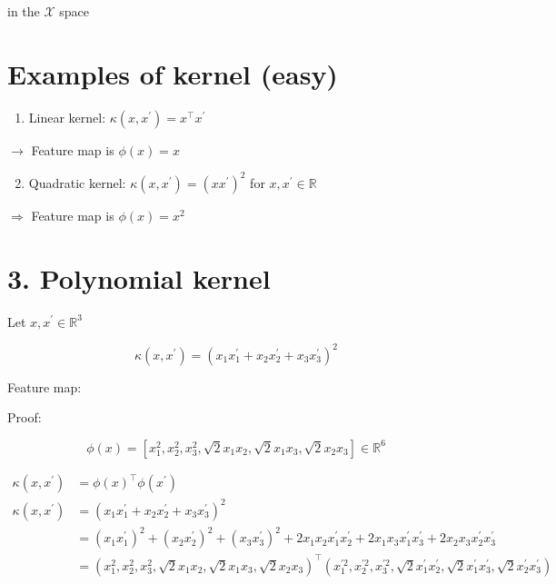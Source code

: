 \documentclass[10pt]{article}
\begin{document}
in the $\mathscr{X}$ space

\section*{Examples of kernel (easy)}
\begin{enumerate}
  \item Linear kernel: $\kappa\left(x, x^{\prime}\right)=x^{\top} x^{\prime}$
\end{enumerate}

$\rightarrow$ Feature map is $\phi(x)=x$

\begin{enumerate}
  \setcounter{enumi}{1}
  \item Quadratic kernel: $\kappa\left(x, x^{\prime}\right)=\left(x x^{\prime}\right)^{2}$ for $x, x^{\prime} \in \mathbb{R}$
\end{enumerate}

$\Rightarrow$ Feature map is $\phi(x)=x^{2}$

\section*{3. Polynomial kernel}
Let $x, x^{\prime} \in \mathbb{R}^{3}$

$$
\kappa\left(x, x^{\prime}\right)=\left(x_{1} x_{1}^{\prime}+x_{2} x_{2}^{\prime}+x_{3} x_{3}^{\prime}\right)^{2}
$$

Feature map:

Proof:

$$
\phi(x)=\left[x_{1}^{2}, x_{2}^{2}, x_{3}^{2}, \sqrt{2} x_{1} x_{2}, \sqrt{2} x_{1} x_{3}, \sqrt{2} x_{2} x_{3}\right] \in \mathbb{R}^{6}
$$

$$
\begin{aligned}
\kappa\left(x, x^{\prime}\right) & =\phi(x)^{\top} \phi\left(x^{\prime}\right) \\
\kappa\left(x, x^{\prime}\right) & =\left(x_{1} x_{1}^{\prime}+x_{2} x_{2}^{\prime}+x_{3} x_{3}^{\prime}\right)^{2} \\
& =\left(x_{1} x_{1}^{\prime}\right)^{2}+\left(x_{2} x_{2}^{\prime}\right)^{2}+\left(x_{3} x_{3}^{\prime}\right)^{2}+2 x_{1} x_{2} x_{1}^{\prime} x_{2}^{\prime}+2 x_{1} x_{3} x_{1}^{\prime} x_{3}^{\prime}+2 x_{2} x_{3} x_{2}^{\prime} x_{3}^{\prime} \\
& =\left(x_{1}^{2}, x_{2}^{2}, x_{3}^{2}, \sqrt{2} x_{1} x_{2}, \sqrt{2} x_{1} x_{3}, \sqrt{2} x_{2} x_{3}\right)^{\top}\left(x_{1}^{\prime 2}, x_{2}^{\prime 2}, x_{3}^{\prime 2}, \sqrt{2} x_{1}^{\prime} x_{2}^{\prime}, \sqrt{2} x_{1}^{\prime} x_{3}^{\prime}, \sqrt{2} x_{2}^{\prime} x_{3}^{\prime}\right)
\end{aligned}
$$
\end{document}
